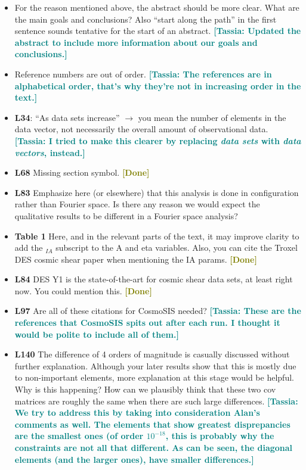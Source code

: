 \documentclass{article}
\newcommand\tassia[1]{{\bf {\textcolor{teal}{[Tassia: #1]}}}}
\newcommand\done{{\bf {\textcolor{olive}{[Done]}}}}
\begin{document}
	\begin{itemize}
	\item For the reason mentioned above, the abstract should be more clear. What are the main goals and conclusions? Also “start along the path” in the first sentence sounds tentative for the start of an abstract. \tassia{Updated the abstract to include more information about our goals and conclusions.}
	\item Reference numbers are out of order. \tassia{The references are in alphabetical order, that's why they're not in increasing order in the text.}
	\item \textbf{L34}: “As data sets increase” $\rightarrow$ you mean the number of elements in the data vector, not necessarily the overall amount of observational data. \tassia{I tried to make this clearer by replacing \textit{data sets} with \textit{data vectors}, instead.}
	\item \textbf{L68} Missing section symbol. \done
	\item \textbf{L83} Emphasize here (or elsewhere) that this analysis is done in configuration rather than Fourier space. Is there any reason we would expect the qualitative results to be different in a Fourier space analysis?
	\item \textbf{Table 1} Here, and in the relevant parts of the text, it may improve clarity to add the $_{IA}$ subscript to the A and eta variables. Also, you can cite the Troxel DES cosmic shear paper when mentioning the IA params. \done
	\item \textbf{L84} DES Y1 is the state-of-the-art for cosmic shear data sets, at least right now. You could mention this. \done
	\item \textbf{L97} Are all of these citations for CosmoSIS needed? \tassia{These are the references that CosmoSIS spits out after each run. I thought it would be polite to include all of them.}
	\item \textbf{L140} The difference of 4 orders of magnitude is casually discussed without further explanation. Although your later results show that this is mostly due to non-important elements, more explanation at this stage would be helpful. Why is this happening? How can we plausibly think that these two cov matrices are roughly the same when there are such large differences. \tassia{We try to address this by taking into consideration Alan's comments as well. The elements that show greatest disprepancies are the smallest ones (of order $10^{-18}$, this is probably why the constraints are not all that different. As can be seen, the diagonal elements (and the larger ones), have smaller differences.}

\end{itemize}
\end{document}
